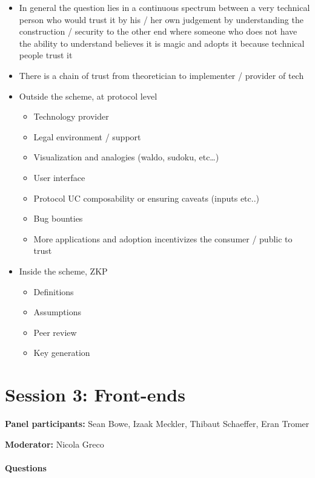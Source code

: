 \begin{itemize}[label={- }]
\item In general the question lies in a continuous spectrum between a very technical person
who would trust it by his / her own judgement by understanding the construction /
security to the other end where someone who does not have the ability to understand
believes it is magic and adopts it because technical people trust it
\item There is a chain of trust from theoretician to implementer / provider of tech
\item Outside the scheme, at protocol level
		\begin{itemize}[label={- }]
		\item Technology provider
		\item Legal environment / support
		\item Visualization and analogies (waldo, sudoku, etc…)
		\item User interface
		\item Protocol UC composability or ensuring caveats (inputs etc..)
		\item Bug bounties
		\item More applications and adoption incentivizes the consumer / public to trust
		\end{itemize}
\item Inside the scheme, ZKP
		\begin{itemize}[label={- }]
		\item Definitions
		\item Assumptions
		\item Peer review
		\item Key generation
		\end{itemize}
\end{itemize}


\section{Session 3: Front-ends}
\label{sec:zcon0:session3-front-ends}

\textbf{Panel participants:} Sean Bowe, Izaak Meckler, Thibaut Schaeffer, Eran Tromer

\textbf{Moderator:} Nicola Greco


\paragraph{Questions}

